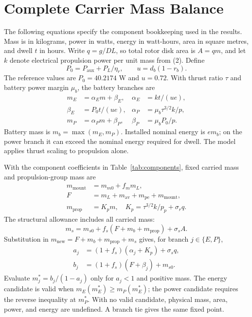 \documentclass[twocolumn,letterpaper]{IEEEAerospaceCLS}
\begin{document}
\appendices
\renewcommand{\theHsection}{appendix.\Alph{section}}
\section{Complete Carrier Mass Balance}
The following equations specify the component bookkeeping used in the results. Mass is in kilograms, power in watts, energy in watt-hours, area in square metres, and dwell $t$ in hours. Write $q=g/DL$, so total rotor disk area is $A=qm$, and let $k$ denote electrical propulsion power per unit mass from (2). Define
\begin{equation}
P_0=P_{\mathrm{aux}}+P_L/\eta_r,\qquad u=d_b(1-r_b).
\end{equation}
The reference values are $P_0=40.2174$ W and $u=0.72$. With thrust ratio $\tau$ and battery power margin $\mu_b$, the battery branches are
\begin{equation}
\begin{aligned}
m_E&=\alpha_E m+\beta_E,& \alpha_E&=kt/(ue),\\
\beta_E&=P_0t/(ue),&\alpha_P&=\mu_b\tau^{3/2}k/p,\\
m_P&=\alpha_Pm+\beta_P,&\beta_P&=\mu_bP_0/p.
\end{aligned}
\end{equation}
Battery mass is $m_b=\max(m_E,m_P)$. Installed nominal energy is $em_b$; on the power branch it can exceed the nominal energy required for dwell. The model applies thrust scaling to propulsion alone.

With the component coefficients in Table~\ref{tab:components}, fixed carried mass and propulsion-group mass are
\begin{equation}
\begin{aligned}
m_{\mathrm{mount}}&=m_{m0}+f_m m_L,\\
F&=m_L+m_{\mathrm{av}}+m_{\mathrm{pe}}+m_{\mathrm{mount}},\\
m_{\mathrm{prop}}&=K_pm,\quad K_p=\tau^{3/2}k/p_p+\sigma_rq.
\end{aligned}
\end{equation}
The structural allowance includes all carried mass:
\begin{equation}
m_s=m_{s0}+f_s(F+m_b+m_{\mathrm{prop}})+\sigma_sA.
\end{equation}
Substitution in $m_{\mathrm{new}}=F+m_b+m_{\mathrm{prop}}+m_s$ gives, for branch $j\in\{E,P\}$,
\begin{equation}
\begin{aligned}
a_j&=(1+f_s)(\alpha_j+K_p)+\sigma_sq,\\
b_j&=(1+f_s)(F+\beta_j)+m_{s0}.
\end{aligned}
\end{equation}
Evaluate $m_j^*=b_j/(1-a_j)$ only for $a_j<1$ and positive mass. The energy candidate is valid when $m_E(m_E^*)\geq m_P(m_E^*)$; the power candidate requires the reverse inequality at $m_P^*$. With no valid candidate, physical mass, area, power, and energy are undefined. A branch tie gives the same fixed point.
\end{document}
